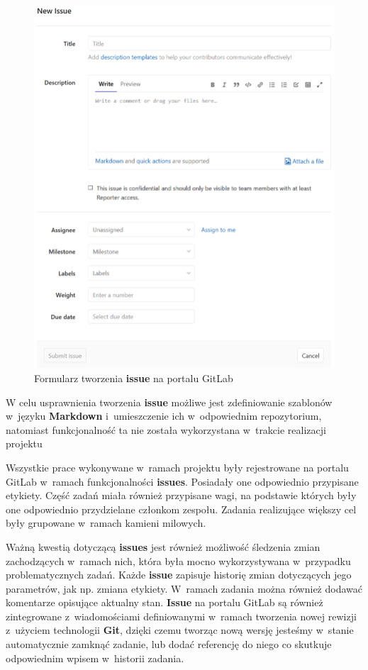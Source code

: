 \begin{figure}[H]
\centering
\includegraphics[width=\textwidth]{res/png/newIssue}
\caption{Formularz tworzenia \textbf{issue} na portalu GitLab}
\label{fig:newIssue}
\end{figure}

W celu usprawnienia tworzenia \textbf{issue} możliwe jest zdefiniowanie szablonów w~języku \textbf{Markdown} i~umieszczenie ich w~odpowiednim repozytorium, natomiast funkcjonalność ta nie została wykorzystana w~trakcie realizacji projektu

\newpage

Wszystkie prace wykonywane w~ramach projektu były rejestrowane na portalu GitLab w~ramach funkcjonalności \textbf{issues}. Posiadały one odpowiednio przypisane etykiety. Część zadań miała również przypisane wagi, na podstawie których były one odpowiednio przydzielane członkom zespołu. Zadania realizujące większy cel były grupowane w~ramach kamieni milowych.

Ważną kwestią dotyczącą \textbf{issues} jest również możliwość śledzenia zmian zachodzących w~ramach nich, która była mocno wykorzystywana w~przypadku problematycznych zadań. Każde \textbf{issue} zapisuje historię zmian dotyczących jego parametrów, jak np. zmiana etykiety. W~ramach zadania można również dodawać komentarze opisujące aktualny stan. \textbf{Issue} na portalu GitLab są również zintegrowane z~wiadomościami definiowanymi w~ramach tworzenia nowej rewizji z~użyciem technologii \textbf{Git}, dzięki czemu tworząc nową wersję jesteśmy w~stanie automatycznie zamknąć zadanie, lub dodać referencję do niego co skutkuje odpowiednim wpisem w~historii zadania.

